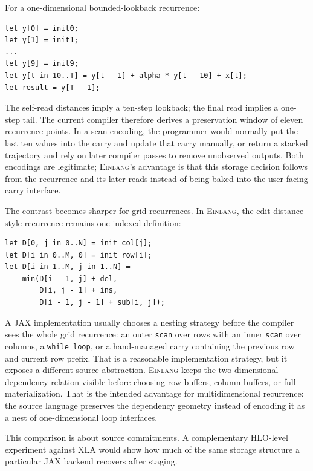 \documentclass[sigplan,screen,nonacm]{acmart}
\newcommand{\einlang}{\textsc{Einlang}}
\begin{document}
For a one-dimensional bounded-lookback recurrence:
\begin{lstlisting}[style=einlang]
let y[0] = init0;
let y[1] = init1;
...
let y[9] = init9;
let y[t in 10..T] = y[t - 1] + alpha * y[t - 10] + x[t];
let result = y[T - 1];
\end{lstlisting}
The self-read distances imply a ten-step lookback; the final read implies a one-step tail. The current compiler therefore derives a preservation window of eleven recurrence points. In a scan encoding, the programmer would normally put the last ten values into the carry and update that carry manually, or return a stacked trajectory and rely on later compiler passes to remove unobserved outputs. Both encodings are legitimate; \einlang{}'s advantage is that this storage decision follows from the recurrence and its later reads instead of being baked into the user-facing carry interface.

The contrast becomes sharper for grid recurrences. In \einlang{}, the edit-distance-style recurrence remains one indexed definition:
\begin{lstlisting}[style=einlang]
let D[0, j in 0..N] = init_col[j];
let D[i in 0..M, 0] = init_row[i];
let D[i in 1..M, j in 1..N] =
    min(D[i - 1, j] + del,
        D[i, j - 1] + ins,
        D[i - 1, j - 1] + sub[i, j]);
\end{lstlisting}
A JAX implementation usually chooses a nesting strategy before the compiler sees the whole grid recurrence: an outer \texttt{scan} over rows with an inner \texttt{scan} over columns, a \texttt{while\_loop}, or a hand-managed carry containing the previous row and current row prefix. That is a reasonable implementation strategy, but it exposes a different source abstraction. \einlang{} keeps the two-dimensional dependency relation visible before choosing row buffers, column buffers, or full materialization. That is the intended advantage for multidimensional recurrence: the source language preserves the dependency geometry instead of encoding it as a nest of one-dimensional loop interfaces.

This comparison is about source commitments. A complementary HLO-level experiment against XLA would show how much of the same storage structure a particular JAX backend recovers after staging.
\end{document}

